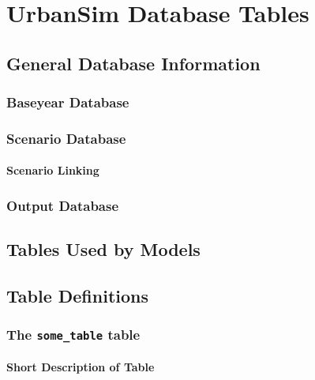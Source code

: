 

\chapter{UrbanSim Database Tables}
\label{chapter:urbansim-database-tables}

\section{General Database Information}
\subsection{Baseyear Database}
\subsection{Scenario Database}
\subsubsection{Scenario Linking}
\subsection{Output Database}
\section{Tables Used by Models}
\section{Table Definitions}
\subsection{The {\tt some_table} table}
\subsubsection{Short Description of Table}
